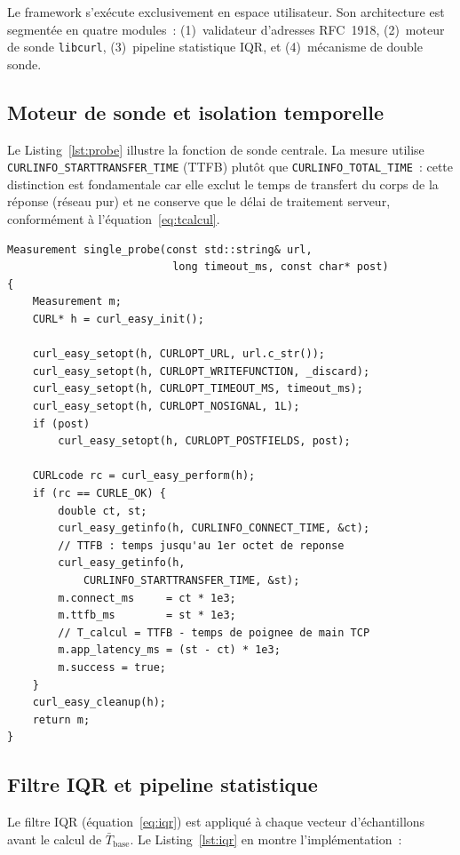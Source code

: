 \documentclass[10pt,conference,compsoc]{IEEEtran}
\begin{document}
Le framework s'exécute exclusivement en espace utilisateur. Son
architecture est segmentée en quatre modules~: (1)~validateur d'adresses
RFC~1918, (2)~moteur de sonde \texttt{libcurl}, (3)~pipeline statistique
IQR, et (4)~mécanisme de double sonde.

\subsection{Moteur de sonde et isolation temporelle}

Le Listing~\ref{lst:probe} illustre la fonction de sonde centrale. La
mesure utilise \texttt{CURLINFO\_STARTTRANSFER\_TIME} (TTFB) plutôt que
\texttt{CURLINFO\_TOTAL\_TIME}~: cette distinction est fondamentale car
elle exclut le temps de transfert du corps de la réponse (réseau pur)
et ne conserve que le délai de traitement serveur, conformément à
l'équation~\eqref{eq:tcalcul}.

\begin{lstlisting}[caption={Moteur d'acquisition temporelle — isolation du $T_{\mathrm{calcul}}$},
                   label={lst:probe}]
Measurement single_probe(const std::string& url,
                          long timeout_ms, const char* post)
{
    Measurement m;
    CURL* h = curl_easy_init();

    curl_easy_setopt(h, CURLOPT_URL, url.c_str());
    curl_easy_setopt(h, CURLOPT_WRITEFUNCTION, _discard);
    curl_easy_setopt(h, CURLOPT_TIMEOUT_MS, timeout_ms);
    curl_easy_setopt(h, CURLOPT_NOSIGNAL, 1L);
    if (post)
        curl_easy_setopt(h, CURLOPT_POSTFIELDS, post);

    CURLcode rc = curl_easy_perform(h);
    if (rc == CURLE_OK) {
        double ct, st;
        curl_easy_getinfo(h, CURLINFO_CONNECT_TIME, &ct);
        // TTFB : temps jusqu'au 1er octet de reponse
        curl_easy_getinfo(h,
            CURLINFO_STARTTRANSFER_TIME, &st);
        m.connect_ms     = ct * 1e3;
        m.ttfb_ms        = st * 1e3;
        // T_calcul = TTFB - temps de poignee de main TCP
        m.app_latency_ms = (st - ct) * 1e3;
        m.success = true;
    }
    curl_easy_cleanup(h);
    return m;
}
\end{lstlisting}

\subsection{Filtre IQR et pipeline statistique}

Le filtre IQR (équation~\eqref{eq:iqr}) est appliqué à chaque vecteur
d'échantillons avant le calcul de $\bar{T}_{\mathrm{base}}$. Le
Listing~\ref{lst:iqr} en montre l'implémentation~:
\end{document}
